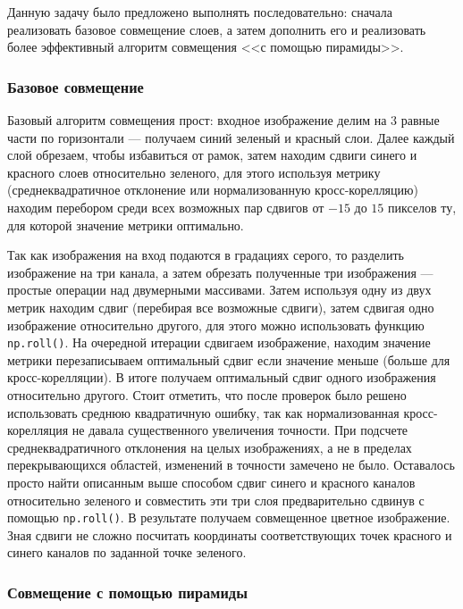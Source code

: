 \documentclass[12pt]{article}
\begin{document}
Данную задачу было предложено выполнять последовательно: сначала реализовать базовое совмещение слоев, а затем дополнить его и реализовать более эффективный алгоритм совмещения <<с помощью пирамиды>>.

\subsubsection*{Базовое совмещение}
Базовый алгоритм совмещения прост: входное изображение делим на 3 равные части по горизонтали --- получаем синий зеленый и красный слои. Далее каждый слой обрезаем, чтобы избавиться от рамок, затем находим сдвиги синего и красного слоев относительно зеленого, для этого используя метрику (среднеквадратичное отклонение или нормализованную кросс-корелляцию) находим перебором среди всех возможных пар сдвигов от $-15$ до $15$ пикселов ту, для которой значение метрики оптимально.

Так как изображения на вход подаются в градациях серого, то разделить изображение на три канала, а затем обрезать полученные три изображения --- простые операции над двумерными массивами. Затем используя одну из двух метрик находим сдвиг (перебирая все возможные сдвиги), затем сдвигая одно изображение относительно другого, для этого можно использовать функцию \texttt{np.roll()}. На очередной итерации сдвигаем изображение, находим значение метрики перезаписываем оптимальный сдвиг если значение меньше (больше для кросс-корелляции). В итоге получаем оптимальный сдвиг одного изображения относительно другого. Стоит отметить, что после проверок было решено использовать среднюю квадратичную ошибку, так как нормализованная кросс-корелляция не давала существенного увеличения точности. При подсчете среднеквадратичного отклонения на целых изображениях, а не в пределах перекрывающихся областей, изменений в точности замечено не было. Оставалось просто найти описанным выше способом сдвиг синего и красного каналов относительно зеленого и совместить эти три слоя предварительно сдвинув с помощью \texttt{np.roll()}. В результате получаем совмещенное цветное изображение. Зная сдвиги не сложно посчитать координаты соответствующих точек красного и синего каналов по заданной точке зеленого.

\subsubsection*{Совмещение с помощью пирамиды}
\end{document}
